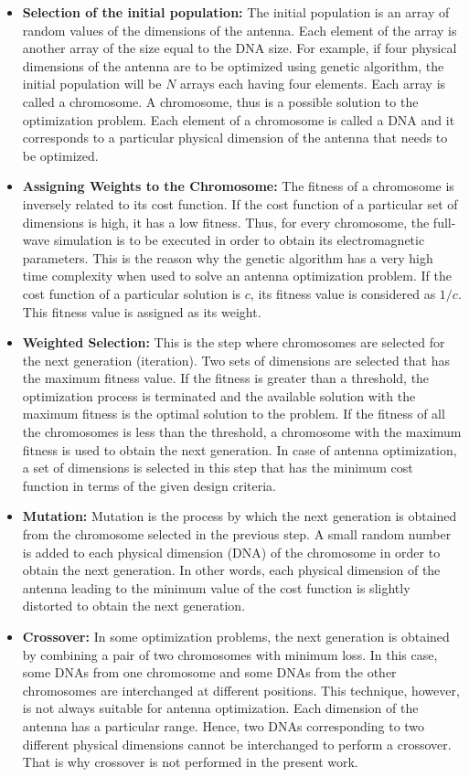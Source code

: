 \begin{itemize}
\item \textbf{Selection of the initial population:} The initial population is an array of random values of the dimensions of the antenna. Each element of the array is another array of the size equal to the DNA size. For example, if four physical dimensions of the antenna are to be optimized using genetic algorithm, the initial population will be $N$ arrays each having four elements. Each array is called a chromosome. A chromosome, thus is a possible solution to the optimization problem. Each element of a chromosome is called a DNA and it corresponds to a particular physical dimension of the antenna that needs to be optimized.
\item \textbf{Assigning Weights to the Chromosome:} The fitness of a chromosome is inversely related to its cost function. If the cost function of a particular set of dimensions is high, it has a low fitness. Thus, for every chromosome, the full-wave simulation is to be executed in order to obtain its electromagnetic parameters. This is the reason why the genetic algorithm has a very high time complexity when used to solve an antenna optimization problem. If the cost function of a particular solution is $c$, its fitness value is considered as $1/c$. This fitness value is assigned as its weight.
\item \textbf{Weighted Selection:} This is the step where chromosomes are selected for the next generation (iteration). Two sets of dimensions are selected that has the maximum fitness value. If the fitness is greater than a threshold, the optimization process is terminated and the available solution with the maximum fitness is the optimal solution to the problem. If the fitness of all the chromosomes is less than the threshold, a chromosome with the maximum fitness is used to obtain the next generation. In case of antenna optimization, a set of dimensions is selected in this step that has the minimum cost function in terms of the given design criteria.
\item \textbf{Mutation:} Mutation is the process by which the next generation is obtained from the chromosome selected in the previous step. A small random number is added to each physical dimension (DNA) of the chromosome in order to obtain the next generation. In other words, each physical dimension of the antenna leading to the minimum value of the cost function is slightly distorted to obtain the next generation.
\item \textbf{Crossover:} In some optimization problems, the next generation is obtained by combining a pair of two chromosomes with minimum loss. In this case, some DNAs from one chromosome and some DNAs from the other chromosomes are interchanged at different positions. This technique, however, is not always suitable for antenna optimization. Each dimension of the antenna has a particular range. Hence, two DNAs corresponding to two different physical dimensions cannot be interchanged to perform a crossover. That is why crossover is not performed in the present work.
\end{itemize}

